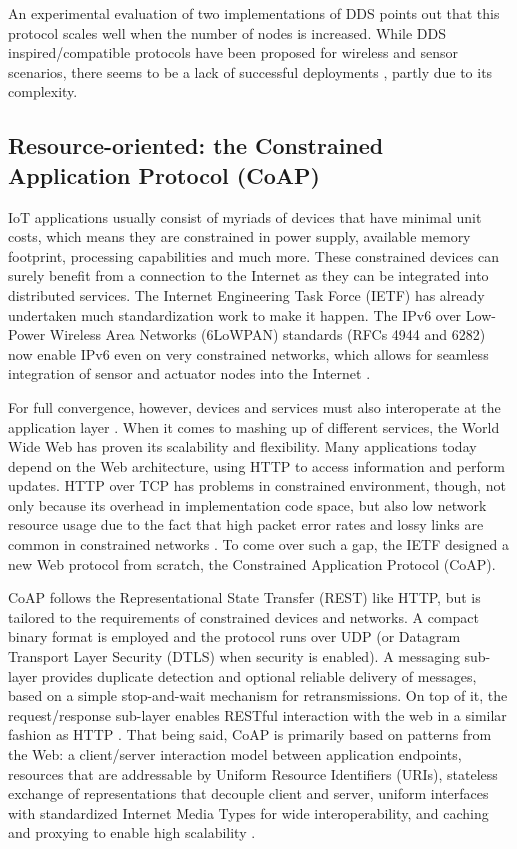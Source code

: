 An experimental evaluation of two implementations of DDS \cite{4536566} points out that this protocol scales well when the number of nodes is increased. While DDS inspired/compatible protocols have been proposed for wireless and sensor scenarios, there seems to be a lack of successful deployments \cite{7396558}, partly due to its complexity. 

\subsection{Resource-oriented: the Constrained Application Protocol (CoAP)}

IoT applications usually consist of myriads of devices that have minimal unit costs, which means they are constrained in power supply, available memory footprint, processing capabilities and much more. These constrained devices can surely benefit from a connection to the Internet as they can be integrated into distributed services. The Internet Engineering Task Force (IETF) has already undertaken much standardization work to make it happen. The IPv6 over Low-Power Wireless Area Networks (6LoWPAN) standards (RFCs 4944 and 6282) now enable IPv6 even on very constrained networks, which allows for seamless integration of sensor and actuator nodes into the Internet \cite{6159216}. 

For full convergence, however, devices and services must also interoperate at the application layer \cite{kovatsch2014californium}. When it comes to mashing up of different services, the World Wide Web has proven its scalability and flexibility. Many applications today depend on the Web architecture, using HTTP to access information and perform updates. HTTP over TCP has problems in constrained environment, though, not only because its overhead in implementation code space, but also low network resource usage due to the fact that high packet error rates and lossy links are common in constrained networks \cite{6159216}. To come over such a gap, the IETF designed a new Web protocol from scratch, the Constrained Application Protocol (CoAP). 

CoAP follows the Representational State Transfer (REST) \cite{fielding2000architectural} like HTTP, but is tailored to the requirements of constrained devices and networks. A compact binary format is employed and the protocol runs over UDP (or Datagram Transport Layer Security (DTLS) when security is enabled). A messaging sub-layer provides duplicate detection and optional reliable delivery of messages, based on a simple stop-and-wait mechanism for retransmissions. On top of it, the request/response sub-layer enables RESTful interaction with the web in a similar fashion as HTTP \cite{kovatsch2014californium}. That being said, CoAP is primarily based on patterns from the Web: a client/server interaction model between application endpoints, resources that are addressable by Uniform Resource Identifiers (URIs), stateless exchange of representations that decouple client and server, uniform interfaces with standardized Internet Media Types for wide interoperability, and caching and proxying to enable high scalability \cite{kovatsch2015scalable}. 

